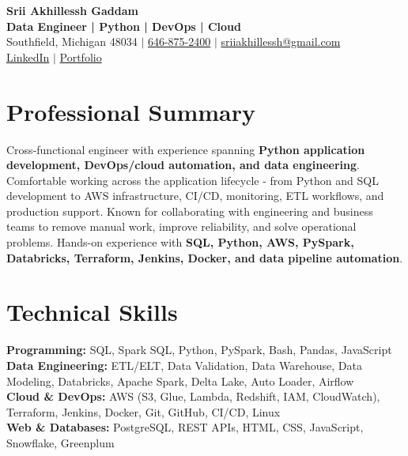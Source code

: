 \documentclass[letterpaper,10pt]{article}
\begin{document}
\fontsize{9.35pt}{10.45pt}\selectfont

\begin{center}
    {\LARGE \textbf{Srii Akhillessh Gaddam}} \\[-1pt]
    \textbf{Data Engineer | Python | DevOps | Cloud} \\[2pt]
    Southfield, Michigan 48034 $|$
    \href{tel:6468752400}{646-875-2400} $|$
    \href{mailto:sriiakhillessh@gmail.com}{sriiakhillessh@gmail.com} \\[1pt]
    \href{https://www.linkedin.com/in/srii-akhiilessh-gaddam-b48668191/}{LinkedIn} $|$
    \href{https://sriiakhillesshg.github.io/portfolio/}{Portfolio}
\end{center}
\vspace{-8pt}

\section{Professional Summary}
\small{Cross-functional engineer with experience spanning \textbf{Python application development, DevOps/cloud automation, and data engineering}. Comfortable working across the application lifecycle - from Python and SQL development to AWS infrastructure, CI/CD, monitoring, ETL workflows, and production support. Known for collaborating with engineering and business teams to remove manual work, improve reliability, and solve operational problems. Hands-on experience with \textbf{SQL, Python, AWS, PySpark, Databricks, Terraform, Jenkins, Docker, and data pipeline automation}.}

\section{Technical Skills}
\small{
\textbf{Programming:} SQL, Spark SQL, Python, PySpark, Bash, Pandas, JavaScript \\
\textbf{Data Engineering:} ETL/ELT, Data Validation, Data Warehouse, Data Modeling, Databricks, Apache Spark, Delta Lake, Auto Loader, Airflow \\
\textbf{Cloud \& DevOps:} AWS (S3, Glue, Lambda, Redshift, IAM, CloudWatch), Terraform, Jenkins, Docker, Git, GitHub, CI/CD, Linux \\
\textbf{Web \& Databases:} PostgreSQL, REST APIs, HTML, CSS, JavaScript, Snowflake, Greenplum
}
\end{document}
